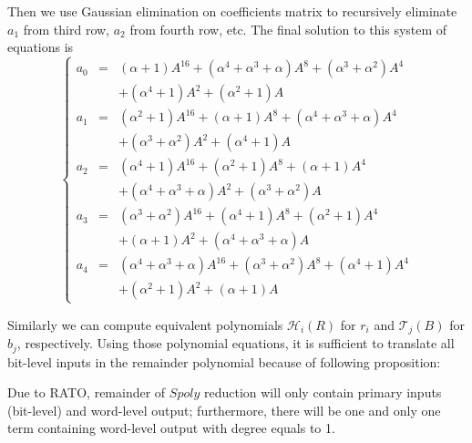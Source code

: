 \begin{Example}
Then we use Gaussian elimination on coefficients matrix 
to recursively eliminate $a_1$ from third row, $a_2$ from fourth row, etc. The final solution to this system of
equations is
\begin{displaymath}
\left\{
  \begin{array}{lcl}
  a_0 & = & (\alpha+1)A^{16}+(\alpha^4+\alpha^3+\alpha)A^8+(\alpha^3+\alpha^2)A^4\\&&+(\alpha^4+1)A^2+(\alpha^2+1)A\\
  a_1 & = & (\alpha^2+1)A^{16}+(\alpha+1)A^8+(\alpha^4+\alpha^3+\alpha)A^4\\&&+(\alpha^3+\alpha^2)A^2+(\alpha^4+1)A\\
  a_2 & = & (\alpha^4+1)A^{16}+(\alpha^2+1)A^8+(\alpha+1)A^4\\&&+(\alpha^4+\alpha^3+\alpha)A^2+(\alpha^3+\alpha^2)A\\
  a_3 & = & (\alpha^3+\alpha^2)A^{16}+(\alpha^4+1)A^8+(\alpha^2+1)A^4\\&&+(\alpha+1)A^2+(\alpha^4+\alpha^3+\alpha)A\\
  a_4 & = & (\alpha^4+\alpha^3+\alpha)A^{16}+(\alpha^3+\alpha^2)A^8+(\alpha^4+1)A^4\\&&+(\alpha^2+1)A^2+(\alpha+1)A
  \end{array} \right.
\end{displaymath}
\end{Example}
Similarly we can compute equivalent polynomials $\mathcal{H}_i(R)$ for $r_i$ and $\mathcal{T}_j(B)$ for $b_j$, respectively.
Using those polynomial equations, it is sufficient to translate all bit-level inputs in the remainder polynomial
because of following proposition:
\begin{Proposition}
\label{lem:bitlevelremainder}
Due to RATO, remainder of $Spoly$ reduction will only contain primary inputs (bit-level) and word-level output; 
furthermore, there will be one and
only one term containing word-level output with degree equals to 1.
\end{Proposition}

